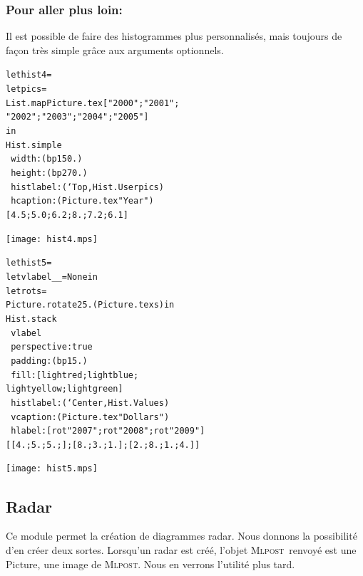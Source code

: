 \documentclass[a4paper,12pt]{article}
\newcommand{\mlpost}{\textsc{Mlpost}}
\begin{document}
\subsubsection{Pour aller plus loin:}
Il est possible de faire des histogrammes plus personnalisés, mais toujours de façon très simple grâce aux arguments optionnels.

\begin{minipage}{0.5\linewidth}
  \begin{alltt}
    let hist4 =
    let pics =
    List.map Picture.tex ["2000";"2001";
      "2002";"2003";"2004";"2005"]
    in
    Hist.simple 
    ~width:(bp 150.)
    ~height:(bp 270.)
    ~histlabel:(`Top, Hist.User pics)
    ~hcaption:(Picture.tex "Year")
    [4.5;5.0;6.2;8.;7.2;6.1]
  \end{alltt}
\end{minipage}
\begin{minipage}{0.5\linewidth}
\begin{center}
\texttt{[image: hist4.mps]}
\end{center}
\end{minipage}

\bigskip

\begin{minipage}{0.5\linewidth}
  \begin{alltt}
    let hist5 =
    let vlabel _ _ = None in
    let rot s = 
    Picture.rotate 25. (Picture.tex s) in
    Hist.stack
    ~vlabel
    ~perspective:true 
    ~padding:(bp 15.)
    ~fill:[lightred;lightblue;
      lightyellow;lightgreen]
    ~histlabel:(`Center, Hist.Values)
    ~vcaption:(Picture.tex "Dollars")
    ~hlabel:[rot "2007";rot "2008";rot "2009"]
    [[4.;5.;5.;]; [8.;3.;1.]; [2.;8.;1.;4.]]
  \end{alltt}
\end{minipage}
\begin{minipage}{0.5\linewidth}
\begin{center}
\texttt{[image: hist5.mps]}
\end{center}
\end{minipage}

\subsection{Radar}
Ce module permet la création de diagrammes radar.
Nous donnons la possibilité d'en créer deux sortes.
Lorsqu'un radar est créé, l'objet \mlpost\ renvoyé est une Picture, une image de \mlpost.
Nous en verrons l'utilité plus tard.
\bigskip 
\end{document}
